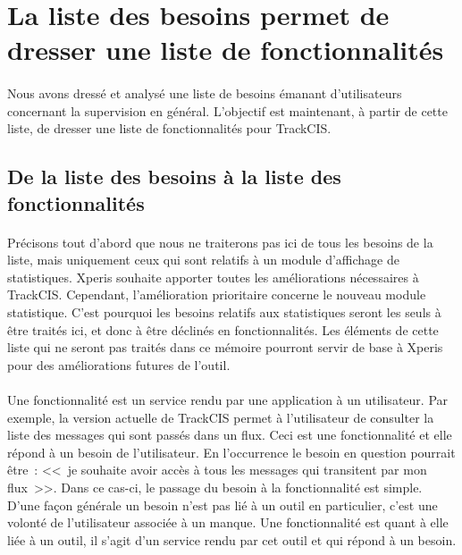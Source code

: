	\section{La liste des besoins permet de dresser une liste de fonctionnalités}
		\paragraph{}%
		Nous avons dressé et analysé une liste de besoins émanant d'utilisateurs
		concernant la supervision en général. L'objectif est maintenant, à partir de
		cette liste, de dresser une liste de fonctionnalités pour TrackCIS.
		
		\subsection{De la liste des besoins à la liste des fonctionnalités}
			\paragraph{}%
			Précisons tout d'abord que nous ne traiterons pas ici de tous les besoins de la
			liste, mais uniquement ceux qui sont relatifs à un module d'affichage de
			statistiques. Xperis souhaite apporter toutes les améliorations nécessaires à
			TrackCIS. Cependant, l'amélioration prioritaire concerne le nouveau module
			statistique. C'est pourquoi les besoins relatifs aux statistiques seront
			les seuls à être traités ici, et donc à être déclinés en
			fonctionnalités.\newline
			Les éléments de cette liste qui ne seront pas traités dans ce mémoire
			pourront servir de base à Xperis pour des améliorations futures de l'outil.
		
			\paragraph{}%
			Une fonctionnalité est un service rendu par une application à un utilisateur.
			Par exemple, la version actuelle de TrackCIS permet à l'utilisateur de
			consulter la liste des messages qui sont passés dans un flux. Ceci est une
			fonctionnalité et elle répond à un besoin de l'utilisateur. En l'occurrence
			le besoin en question pourrait être~: <<~je souhaite avoir accès à tous les
			messages qui transitent par mon flux~>>.
			Dans ce cas-ci, le passage du besoin à la fonctionnalité est simple. D’une
			façon générale un besoin n'est pas lié à un outil en particulier, c'est une
			volonté de l'utilisateur associée à un manque.
			Une fonctionnalité est quant à elle liée à un outil, il
			s'agit d'un service rendu par cet outil et qui répond à un besoin.
		
